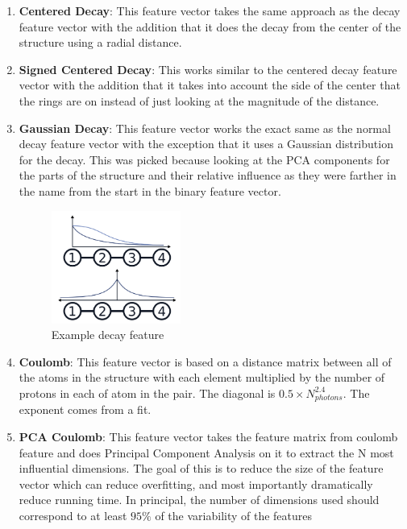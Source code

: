 \begin{enumerate}
\item \textbf{Centered Decay}: This feature vector takes the same approach as the decay feature vector with the addition that it does the decay from the center of the structure using a radial distance.

\item \textbf{Signed Centered Decay}: This works similar to the centered decay feature vector with the addition that it takes into account the side of the center that the rings are on instead of just looking at the magnitude of the distance.

\item \textbf{Gaussian Decay}: This feature vector works the exact same as the normal decay feature vector with the exception that it uses a Gaussian distribution for the decay. This was picked because looking at the PCA components for the parts of the structure and their relative influence as they were farther in the name from the start in the binary feature vector.

\begin{figure}[H]
\begin{center}
\includegraphics [width=0.4\textwidth]{decay.png}
\caption{Example decay feature}\label{decay}
\end{center}
\end{figure}

\item \textbf{Coulomb}: This feature vector is based on a distance matrix between all of the atoms in the structure with each element multiplied by the number of protons in each of atom in the pair. The diagonal is $0.5 \times N_{photons}^{2.4}$. The exponent comes from a fit.

\item \textbf{PCA Coulomb}: This feature vector takes the feature matrix from coulomb feature and does Principal Component Analysis on it to extract the N most influential dimensions. The goal of this is to reduce the size of the feature vector which can reduce overfitting, and most importantly dramatically reduce running time. In principal, the number of dimensions used should correspond to at least $95\% $ of the variability of the features


\end{enumerate}
